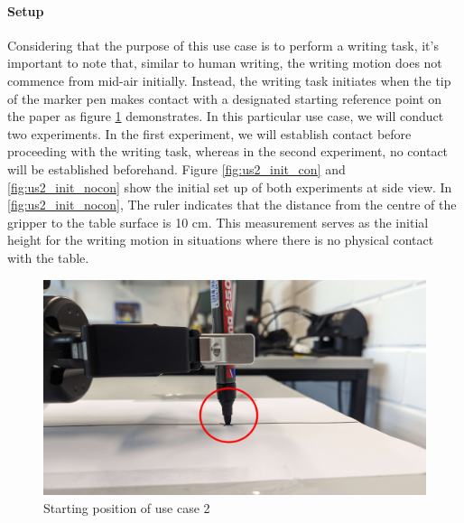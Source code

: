 \documentclass[report.tex]{subfiles}
\begin{document}
    \paragraph{\large{Setup}\\}
    Considering that the purpose of this use case is to perform a writing task, it's important to note that, similar to human writing, the writing motion does not commence from mid-air initially. Instead, the writing task initiates when the tip of the marker pen makes contact with a designated starting reference point on the paper as figure \ref{fig:us2_pen} demonstrates. In this particular use case, we will conduct two experiments. In the first experiment, we will establish contact before proceeding with the writing task, whereas in the second experiment, no contact will be established beforehand. Figure \ref{fig:us2_init_con} and \ref{fig:us2_init_nocon} show the initial set up of both experiments at side view. In \ref{fig:us2_init_nocon}, The ruler indicates that the distance from the centre of the gripper to the table surface is 10 cm. This measurement serves as the initial height for the writing motion in situations where there is no physical contact with the table.
    \begin{figure}[H]
        \centering
        \captionsetup[figure]{justification=centering}
        \includegraphics[width=0.8\linewidth]{images/us2_starting_circle.jpg}
        \caption{Starting position of use case 2}
        \label{fig:us2_pen}
    \end{figure}
\end{document}
